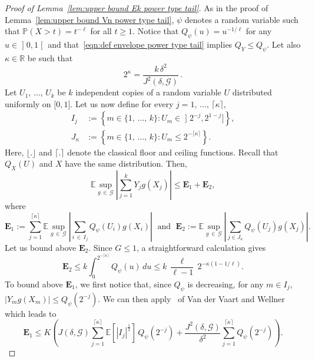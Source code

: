 \documentclass[AHL,Unicode,longabstracts,published]{cedram}
\newcommand{\bE}{\mathbb{E}}
\newcommand{\bP}{\mathbb{P}}
\newcommand{\bR}{\mathbb{R}}
\newcommand{\bfE}{\mathbf{E}}
\newcommand{\caG}{\mathscr{G}}
\newcommand{\intervalleoo}[2]{\mathopen{]} #1\mathclose{}\mathpunct{},#2\mathclose{[}}
\newcommand{\intervalleff}[2]{\mathopen{[} #1\mathclose{}\mathpunct{},#2\mathclose{]}}
\newcommand{\intervalleof}[2]{\mathopen{]} #1\mathclose{}\mathpunct{},#2\mathclose{]}}
\begin{document}
\begin{proof}[Proof of Lemma~\ref{lem:upper bound Ek power type tail}]
As in the proof of Lemma~\ref{lem:upper bound Vn power type tail}, $\psi$ denotes a random variable such that $\bP(X>t)=t^{-\ell}$ for all $t\geq1$. Notice that $Q_\psi(u)=u^{-1/\ell}$ for any $u\in \intervalleoo 01$ and that~\eqref{eqn:def envelope power type tail} implies $Q_Y\leq Q_\psi$. Let also $\kappa\in\bR$ be such that
\begin{equation}\label{eqn:def kappa}
2^\kappa = \frac{k\,\delta^2}{J^2(\delta,\caG)}\,.
\end{equation}
Let $U_1,\,\ldots,\,U_k$ be $k$ independent copies of a random variable $U$ distributed uniformly on $\intervalleff 01$. Let us now define for every $j=1,\,\ldots,\,\lceil\kappa\rceil$,
\begin{align*}
I_j &:= \left\{ m\in\{1,\,\ldots,\,k\} : U_m\in\intervalleof {2^{-j}}{ 2^{1-j}} \right\}, \\
J_\kappa &:= \left\{ m\in\{1,\,\ldots,\,k\} : U_m\leq 2^{-\lceil\kappa\rceil}\right\}.
\end{align*}
Here, $\lfloor. \rfloor$ and $\lceil.\rceil$ denote the classical floor and ceiling functions. Recall that $Q_X(U)$ and $X$ have the same distribution. Then,
\begin{equation}\label{eqn:bound mean decomposition}
\bE\sup_{g\,\in\,\caG}\left|\sum_{j=1}^k Y_jg(X_j)\right|\leq \bfE_1 + \bfE_2,
\end{equation}
where
\[
\bfE_1:= \sum_{j=1}^{\lceil\kappa\rceil} \bE\sup_{g\,\in\,\caG}\left|\sum_{i\,\in\,I_j}Q_\psi(U_i)g(X_i)\right|\;\text{ and }\; \bfE_2:=\bE\sup_{g\,\in\,\caG}\left|\sum_{j\in J_\kappa}Q_\psi(U_j)g(X_j)\right|.
\]
Let us bound above $\bfE_2$. Since $G\leq 1$, a straightforward calculation gives
\begin{equation}\label{eqn:Final E_2}
\bfE_2 \leq k\int_0^{2^{-\lceil\kappa\rceil}} Q_\psi(u)\,du \leq k\, \frac{\ell}{\ell-1}\,2^{-\kappa(1-1/\ell)}.
\end{equation}
To bound above $\bfE_1$, we first notice that, since $Q_\psi$ is decreasing, for any $m\in I_j$, $|Y_mg(X_m)|\leq Q_\psi(2^{-j})$. We can then apply~\cite[Theorem~2.1]{vdVW11} of Van der Vaart and Wellner which leads to
\begin{equation}\label{eqn:E_1 eq1}
\bfE_1\leq K\left(J(\delta,\caG)\sum_{j=1}^{\lceil\kappa\rceil} \bE\left[|I_j|^{\frac{1}{2}}\right]\,Q_\psi(2^{-j}) + \frac{J^2(\delta,\caG)}{\delta^2}\sum_{j=1}^{\lceil\kappa\rceil} Q_\psi(2^{-j})\right).
\end{equation}

\end{proof}
\end{document}
